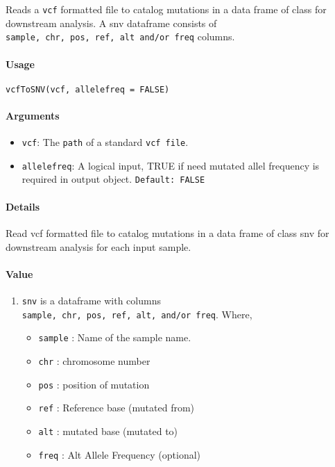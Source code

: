 \documentclass[]{article}
\providecommand{\tightlist}{%
  \setlength{\itemsep}{0pt}\setlength{\parskip}{0pt}}
\let\oldparagraph\paragraph
\renewcommand{\paragraph}[1]{\oldparagraph{#1}\mbox{}}
\begin{document}
Reads a \texttt{vcf} formatted file to catalog mutations in a data frame
of class  for downstream analysis. A snv dataframe consists of
\texttt{sample,\ chr,\ pos,\ ref,\ alt\ and/or\ freq} columns.

\paragraph{\texorpdfstring{\textbf{Usage}}{Usage}}\label{usage}

\texttt{vcfToSNV(vcf,\ allelefreq\ =\ FALSE)}

\paragraph{\texorpdfstring{\textbf{Arguments
}}{Arguments }}\label{arguments}

\begin{itemize}
\tightlist
\item
  \texttt{vcf}: The \texttt{path} of a standard \texttt{vcf\ file}.
\item
  \texttt{allelefreq}: A logical input, TRUE if need mutated allel
  frequency is required in output object. \texttt{Default:\ FALSE}
\end{itemize}

\paragraph{\texorpdfstring{\textbf{Details}}{Details}}\label{details}

Read vcf formatted file to catalog mutations in a data frame of class
snv for downstream analysis for each input sample.

\hypertarget{snv}{\paragraph{\texorpdfstring{\textbf{Value}}{Value}}\label{snv}}

\begin{enumerate}
\def\labelenumi{\arabic{enumi}.}
\tightlist
\item
  \texttt{snv} is a dataframe with columns
  \texttt{sample,\ chr,\ pos,\ ref,\ alt,\ and/or\ freq}. Where,

  \begin{itemize}
  \tightlist
  \item
    \texttt{sample} : Name of the sample name.
  \item
    \texttt{chr} : chromosome number
  \item
    \texttt{pos} : position of mutation
  \item
    \texttt{ref} : Reference base (mutated from)
  \item
    \texttt{alt} : mutated base (mutated to)
  \item
    \texttt{freq} : Alt Allele Frequency (optional)
  \end{itemize}
\end{enumerate}
\end{document}
